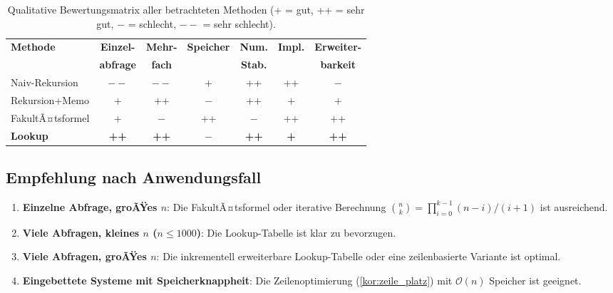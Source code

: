 ﻿\documentclass[12pt, a4paper]{article}
\newcommand{\Oh}{\mathcal{O}}
\theoremstyle{plain}
\theoremstyle{definition}
\theoremstyle{remark}
\renewcommand{\Oh}{\mathcal{O}}
\begin{document}
\begin{table}[H]
  \centering
  \caption{Qualitative Bewertungsmatrix aller betrachteten Methoden
    (+ = gut, ++ = sehr gut, $-$ = schlecht, $--$ = sehr schlecht).}
  \label{tab:bewertung}
  \begin{tabular}{lcccccc}
    \toprule
    \textbf{Methode} & \textbf{Einzel-} & \textbf{Mehr-} & \textbf{Speicher} &
    \textbf{Num.} & \textbf{Impl.} & \textbf{Erweiter-} \\
    & \textbf{abfrage} & \textbf{fach} & & \textbf{Stab.} & \textbf{} & \textbf{barkeit} \\
    \midrule
    Naiv-Rekursion & $--$ & $--$ & + & ++ & ++ & $-$ \\
    Rekursion+Memo & + & ++ & $-$ & ++ & + & + \\
    FakultÃ¤tsformel & + & $-$ & ++ & $-$ & ++ & ++ \\
    \textbf{Lookup} & \textbf{++} & \textbf{++} & \textbf{$-$} &
    \textbf{++} & \textbf{+} & \textbf{++} \\
    \bottomrule
  \end{tabular}
\end{table}

\subsection{Empfehlung nach Anwendungsfall}

\begin{enumerate}[label=\textbf{Fall \arabic*:}]
  \item \textbf{Einzelne Abfrage, groÃŸes $n$}: Die FakultÃ¤tsformel oder
        iterative Berechnung $\binom{n}{k} = \prod_{i=0}^{k-1}(n-i)/(i+1)$
        ist ausreichend.
  \item \textbf{Viele Abfragen, kleines $n$ ($n \le 1000$)}:
        Die Lookup-Tabelle ist klar zu bevorzugen.
  \item \textbf{Viele Abfragen, groÃŸes $n$}:
        Die inkrementell erweiterbare Lookup-Tabelle oder eine
        zeilenbasierte Variante ist optimal.
  \item \textbf{Eingebettete Systeme mit Speicherknappheit}:
        Die Zeilenoptimierung (\cref{kor:zeile_platz}) mit $\Oh(n)$
        Speicher ist geeignet.
\end{enumerate}


\end{document}
